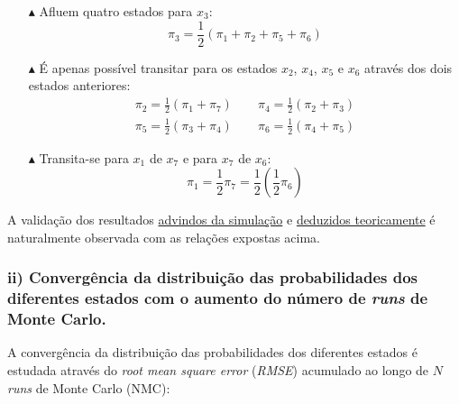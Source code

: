 \begin{itemize}
    \item[$\blacktriangle$] Afluem quatro estados para $x_3$: 
    \vspace{-0.35em}
    $$ \pi_3 = \dfrac{1}{2}\left(\pi_1 + \pi_2 + \pi_5 + \pi_6\right) $$

    \vspace{-1em}\item[$\blacktriangle$] É apenas possível transitar para os estados $x_2$, $x_4$, $x_5$ e $x_6$ através dos dois estados anteriores:
    \vspace{-1.15em}
    \begin{gather*}
        \pi_2 = \frac{1}{2}(\pi_1 + \pi_7)\qquad\pi_4 = \frac{1}{2}(\pi_2 + \pi_3) \\
        \pi_5 = \frac{1}{2}(\pi_3 + \pi_4)\qquad\pi_6 = \frac{1}{2}(\pi_4 + \pi_5)
    \end{gather*}

    \vspace{-1em}\item[$\blacktriangle$] Transita-se para $x_1$ de $x_7$ e para $x_7$ de $x_6$:
    \vspace{-0.35em}
    $$ \pi_1 = \frac{1}{2}\pi_7 = \frac{1}{2}\left(\frac{1}{2}\pi_6\right) $$
\end{itemize}

A validação dos resultados \hyperref[subsubsec:P1b]{advindos da simulação} e \hyperref[subsec:intro]{deduzidos teoricamente} é naturalmente observada com as relações expostas acima.
\subsubsection{ii) Convergência da distribuição das probabilidades dos diferentes estados com o aumento do número de \textit{runs} de Monte Carlo.}
\label{subsubsec:P2ii}

A convergência da distribuição das probabilidades dos diferentes estados é estudada através do \textit{root mean square error} (\textit{RMSE}) acumulado ao longo de $N$ \textit{runs} de Monte Carlo (NMC)\footnotemark[3]:


